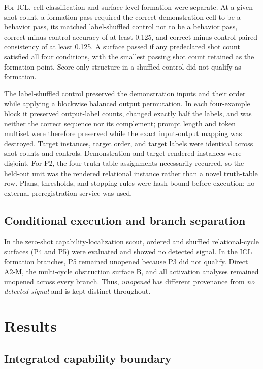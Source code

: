 \documentclass[10pt,a4paper]{article}
\begin{document}
For ICL, cell classification and surface-level formation were separate. At a given shot count, a formation pass required the correct-demonstration cell to be a behavior pass, its matched label-shuffled control not to be a behavior pass, correct-minus-control accuracy of at least 0.125, and correct-minus-control paired consistency of at least 0.125. A surface passed if any predeclared shot count satisfied all four conditions, with the smallest passing shot count retained as the formation point. Score-only structure in a shuffled control did not qualify as formation.

The label-shuffled control preserved the demonstration inputs and their order while applying a blockwise balanced output permutation. In each four-example block it preserved output-label counts, changed exactly half the labels, and was neither the correct sequence nor its complement; prompt length and token multiset were therefore preserved while the exact input-output mapping was destroyed. Target instances, target order, and target labels were identical across shot counts and controls. Demonstration and target rendered instances were disjoint. For P2, the four truth-table assignments necessarily recurred, so the held-out unit was the rendered relational instance rather than a novel truth-table row. Plans, thresholds, and stopping rules were hash-bound before execution; no external preregistration service was used.

\subsection{Conditional execution and branch separation}

In the zero-shot capability-localization scout, ordered and shuffled relational-cycle surfaces (P4 and P5) were evaluated and showed no detected signal. In the ICL formation branches, P5 remained unopened because P3 did not qualify. Direct A2-M, the multi-cycle obstruction surface B, and all activation analyses remained unopened across every branch. Thus, \emph{unopened} has different provenance from \emph{no detected signal} and is kept distinct throughout.

\section{Results}

\subsection{Integrated capability boundary}
\end{document}
